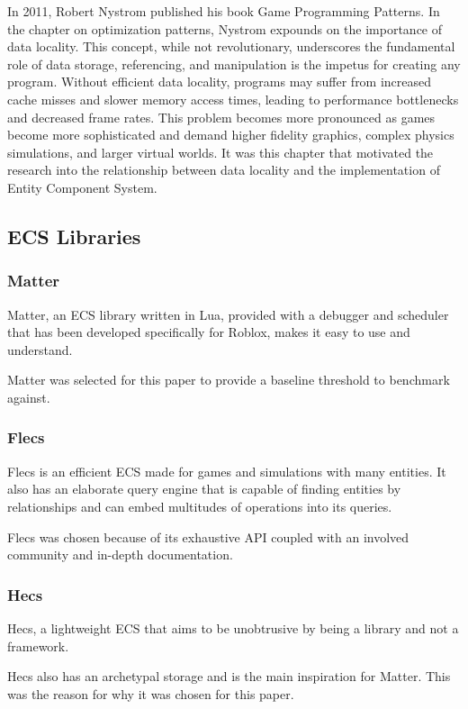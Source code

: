 \documentclass[openany, amssymb, psamsfonts]{amsart}
\theoremstyle{definition}
\numberwithin{equation}{section}
\begin{document}
In 2011, Robert Nystrom published his book Game Programming Patterns. In the chapter on 
optimization patterns, Nystrom expounds on the importance of data locality. This concept, 
while not revolutionary, underscores the fundamental role of data storage, referencing, and 
manipulation is the impetus for creating any program. Without efficient data locality, programs 
may suffer from increased cache misses and slower memory access times, leading to performance 
bottlenecks and decreased frame rates. This problem becomes more pronounced as games become 
more sophisticated and demand higher fidelity graphics, complex physics simulations, and 
larger virtual worlds. It was this chapter that motivated the research into the relationship 
between data locality and the implementation of Entity Component System.

\subsection{ECS Libraries}
\subsubsection{Matter}
Matter, an ECS library written in Lua, provided with a debugger and scheduler that has been developed
specifically for Roblox, makes it easy to use and understand. 

Matter was selected for this paper to provide
a baseline threshold to benchmark against.

\subsubsection{Flecs}
Flecs is an efficient ECS made for games and simulations with many entities. It also has an elaborate
query engine that is capable of finding entities by relationships\cite{Flecs} and can embed multitudes of operations
into its queries.

Flecs was chosen because of its exhaustive API coupled with an involved community and in-depth documentation.

\subsubsection{Hecs}
Hecs, a lightweight ECS that aims to be unobtrusive by being a library and not a framework.

Hecs also has an archetypal storage and is the main inspiration for Matter. This was the reason for why it was chosen for this paper.
\end{document}
